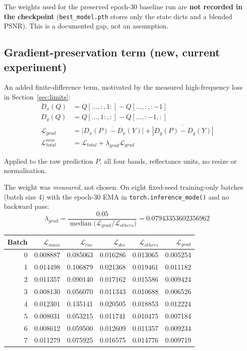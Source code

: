 \documentclass[10pt,a4paper]{article}
\newcommand{\code}[1]{\texttt{#1}}
\begin{document}
The weights used for the preserved epoch-30 baseline run are \textbf{not recorded in the
checkpoint} (\code{best\_model.pth} stores only the state dicts and a blended PSNR). This is a
documented gap, not an assumption.

\subsection{Gradient-preservation term (new, current experiment)}
\label{sec:gradloss}

An added finite-difference term, motivated by the measured high-frequency loss in
Section~\ref{sec:limits}:
\begin{align}
D_x(Q) &= Q[\dots,:,1:] - Q[\dots,:,:-1] \\
D_y(Q) &= Q[\dots,1:,:] - Q[\dots,:-1,:] \\
\mathcal{L}_{grad} &= \overline{|D_x(P)-D_x(Y)|} + \overline{|D_y(P)-D_y(Y)|} \\
\mathcal{L}_{total}^{new} &= \mathcal{L}_{total} + \lambda_{grad}\mathcal{L}_{grad}
\end{align}

Applied to the raw prediction $P$, all four bands, reflectance units, no resize or normalisation.

The weight was \emph{measured}, not chosen. On eight fixed-seed training-only batches (batch
size 4) with the epoch-30 EMA in \code{torch.inference\_mode()} and no backward pass:
\begin{equation}
\lambda_{grad} = \frac{0.05}{\operatorname{median}\!\big(\mathcal{L}_{grad}/\mathcal{L}_{others}\big)}
= 0.07943353602356962
\label{eq:lambda}
\end{equation}

\begin{center}
\begin{tabular}{@{}rrrrrr@{}}
\hline
Batch & $\mathcal{L}_{main}$ & $\mathcal{L}_{enc}$ & $\mathcal{L}_{dec}$
     & $\mathcal{L}_{others}$ & $\mathcal{L}_{grad}$ \\
\hline
0 & 0.008887 & 0.085063 & 0.016286 & 0.013065 & 0.005254 \\
1 & 0.014498 & 0.106879 & 0.021368 & 0.019461 & 0.011182 \\
2 & 0.011357 & 0.090140 & 0.017162 & 0.015586 & 0.009424 \\
3 & 0.008130 & 0.056070 & 0.011343 & 0.010688 & 0.006526 \\
4 & 0.012301 & 0.135141 & 0.020505 & 0.018853 & 0.012224 \\
5 & 0.008031 & 0.053215 & 0.011741 & 0.010475 & 0.007184 \\
6 & 0.008612 & 0.059500 & 0.012609 & 0.011357 & 0.009234 \\
7 & 0.011279 & 0.075925 & 0.016575 & 0.014776 & 0.009719 \\
\hline
\end{tabular}
\end{center}
\end{document}
